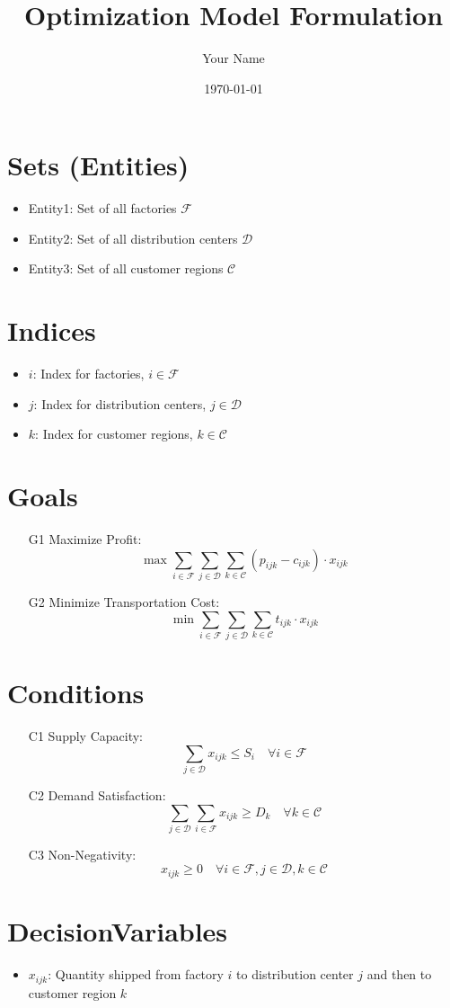 \documentclass{article}
\title{Optimization Model Formulation}
\author{Your Name}
\date{\today}
\begin{document}
\maketitle
\tableofcontents
\newpage

\section{Sets (Entities)}
\begin{itemize}
    \item Entity1: Set of all factories $\mathcal{F}$
    \item Entity2: Set of all distribution centers $\mathcal{D}$
    \item Entity3: Set of all customer regions $\mathcal{C}$
\end{itemize}

\section{Indices}
\begin{itemize}
    \item $i$: Index for factories, $i \in \mathcal{F}$
    \item $j$: Index for distribution centers, $j \in \mathcal{D}$
    \item $k$: Index for customer regions, $k \in \mathcal{C}$
\end{itemize}

\section{Goals}
\begin{itemize}
    \item[G1] Maximize Profit: 
    $$
    \max \sum_{i \in \mathcal{F}} \sum_{j \in \mathcal{D}} \sum_{k \in \mathcal{C}} (p_{ijk} - c_{ijk}) \cdot x_{ijk}
    $$
    \item[G2] Minimize Transportation Cost: 
    $$
    \min \sum_{i \in \mathcal{F}} \sum_{j \in \mathcal{D}} \sum_{k \in \mathcal{C}} t_{ijk} \cdot x_{ijk}
    $$
\end{itemize}

\section{Conditions}
\begin{itemize}
    \item[C1] Supply Capacity: 
    $$
    \sum_{j \in \mathcal{D}} x_{ijk} \leq S_i \quad \forall i \in \mathcal{F}
    $$
    \item[C2] Demand Satisfaction: 
    $$
    \sum_{j \in \mathcal{D}} \sum_{i \in \mathcal{F}} x_{ijk} \geq D_k \quad \forall k \in \mathcal{C}
    $$
    \item[C3] Non-Negativity: 
    $$
    x_{ijk} \geq 0 \quad \forall i \in \mathcal{F}, j \in \mathcal{D}, k \in \mathcal{C}
    $$
\end{itemize}

\section{DecisionVariables}
\begin{itemize}
    \item $x_{ijk}$: Quantity shipped from factory $i$ to distribution center $j$ and then to customer region $k$
\end{itemize}
\end{document}
